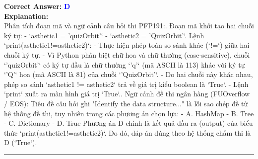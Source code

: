 \documentclass[11pt,a4paper]{article}
\begin{document}
\begin{minipage}{\textwidth}
\noindent \textbf{Correct Answer:} \textcolor{blue}{\textbf{D}} \\[4pt]
\noindent \textbf{Explanation:}\\
Phân tích đoạn mã và ngữ cảnh câu hỏi thi PFP191:. Đoạn mã khởi tạo hai chuỗi ký tự:\newline
   - `asthetic1 = 'quizOrbit'`\newline
   - `asthetic2 = 'QuizOrbit'`. Lệnh `print(asthetic1!=asthetic2)`:\newline
   - Thực hiện phép toán so sánh khác (`!=`) giữa hai chuỗi ký tự.\newline
   - Vì Python phân biệt chữ hoa và chữ thường (case-sensitive), chuỗi `'quizOrbit'` có ký tự đầu là chữ thường `'q'` (mã ASCII là 113) khác với ký tự `'Q'` hoa (mã ASCII là 81) của chuỗi `'QuizOrbit'`.\newline
   - Do hai chuỗi này khác nhau, phép so sánh `asthetic1 != asthetic2` trả về giá trị kiểu boolean là `True`.\newline
   - Lệnh `print` xuất ra màn hình giá trị `True`.. Ngữ cảnh đề thi ngân hàng (FUOverflow / EOS): Tiêu đề câu hỏi ghi "Identify the data structure..." là lỗi sao chép đề từ hệ thống đề thi, tuy nhiên trong các phương án chọn lựa:\newline
   - A. HashMap\newline
   - B. Tree\newline
   - C. Dictionary\newline
   - D. True\newline
   Phương án D chính là kết quả đầu ra (output) của biểu thức `print(asthetic1!=asthetic2)`.\newline
Do đó, đáp án đúng theo hệ thống chấm thi là D (`True`).
\end{minipage}
\vspace{0.8cm}
\hrule
\vspace{0.5cm}
\end{document}
